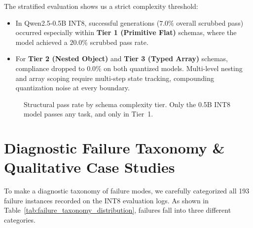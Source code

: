 \documentclass[10pt,journal,compsoc]{IEEEtran}
\begin{document}
The stratified evaluation shows us a strict complexity threshold:
\begin{itemize}
    \item In Qwen2.5-0.5B INT8, successful generations ($7.0\%$ overall scrubbed pass) occurred especially within \textbf{Tier 1 (Primitive Flat)} schemas, where the model achieved a $20.0\%$ scrubbed pass rate.
    \item For \textbf{Tier 2 (Nested Object)} and \textbf{Tier 3 (Typed Array)} schemas, compliance dropped to $0.0\%$ on both quantized models. Multi-level nesting and array scoping require multi-step state tracking, compounding quantization noise at every boundary.
\end{itemize}

\begin{figure}[!t]
\centering
{}
\caption{Structural pass rate by schema complexity tier. Only the 0.5B INT8 model passes any task, and only in Tier~1.}
\label{fig:tier_results}
\end{figure}

\section{Diagnostic Failure Taxonomy \& Qualitative Case Studies}

To make a diagnostic taxonomy of failure modes, we carefully categorized all 193 failure instances recorded on the INT8 evaluation logs. As shown in Table~\ref{tab:failure_taxonomy_distribution}, failures fall into three different categories.
\end{document}
